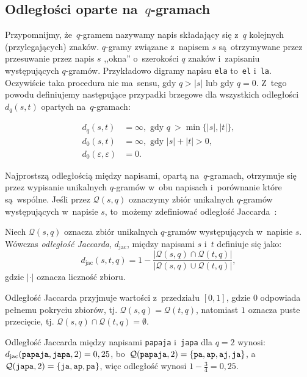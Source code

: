\documentclass{praca1}
\begin{document}
\subsection{Odległości oparte na~$q$-gramach}

Przypomnijmy, że~$q$-gramem nazywamy napis składający się z~$q$ kolejnych (przylegających) znaków. $q$-gramy związane z~napisem $s$ są~otrzymywane przez przesuwanie przez napis $s$ ,,okna'' o~szerokości $q$ znaków i~zapisaniu występujących $q$-gramów. Przykładowo digramy napisu \verb|ela| to~\verb|el| i~\verb|la|. Oczywiście taka procedura nie ma~sensu, gdy $q > |s|$ lub gdy $q = 0$. Z~tego powodu definiujemy następujące przypadki brzegowe dla wszystkich odległości $d_q(s,t)$ opartych na~$q$-gramach:

\begin{align*}
d_q(s,t) &= \infty, \text{ gdy } q~> \min\{|s|, |t|\},\\
d_0(s,t) &= \infty, \text{ gdy } |s| + |t| > 0, \\
d_0(\varepsilon,\varepsilon) &= 0.
\end{align*}

Najprostszą odległością między napisami, opartą na~$q$-gramach, otrzymuje się przez wypisanie unikalnych $q$-gramów w~obu napisach i~porównanie które są~wspólne. Jeśli przez $\mathcal{Q}(s,q)$ oznaczymy zbiór unikalnych $q$-gramów występujących w~napisie $s$, to~możemy zdefiniować odległość Jaccarda~\cite{Loo2014:stringdist}:

\begin{definition}
Niech $\mathcal{Q}(s,q)$ oznacza zbiór unikalnych $q$-gramów występujących w~napisie $s$. Wówczas \emph{odległość Jaccarda}, $d_{\mathrm{jac}}$, między napisami $s$ i~$t$ definiuje się jako:
\begin{equation*}
d_{\mathrm{jac}}(s,t,q) = 1 - \frac{|\mathcal{Q}(s,q) \cap \mathcal{Q}(t,q)|}{|\mathcal{Q}(s,q) \cup \mathcal{Q}(t,q)|},
\end{equation*}
gdzie $|\cdot|$ oznacza liczność zbioru.
\end{definition} 

Odległość Jaccarda przyjmuje wartości z~przedziału $[0,1]$, gdzie $0$ odpowiada pełnemu pokryciu zbiorów, tj. $\mathcal{Q}(s,q) = \mathcal{Q}(t,q)$, natomiast $1$ oznacza puste przecięcie, tj. \hbox{$\mathcal{Q}(s,q) \cap \mathcal{Q}(t,q) = \emptyset$.}

\begin{example}
Odległość Jaccarda między napisami \verb|papaja| i~\verb|japa| dla $q = 2$ wynosi: $d_{\mathrm{jac}}(\verb|papaja|, \verb|japa|, 2)  = 0,25$, bo~$\mathcal{Q}(\verb|papaja|, 2) = \{\verb|pa|, \verb|ap|, \verb|aj|, \verb|ja|\}$, a~$\mathcal{Q}(\verb|japa|, 2) = \{\verb|ja|, \verb|ap|, \verb|pa|\}$, więc odległość wynosi $1 - \frac{3}{4} = 0,25$.
\end{example}
\end{document}
